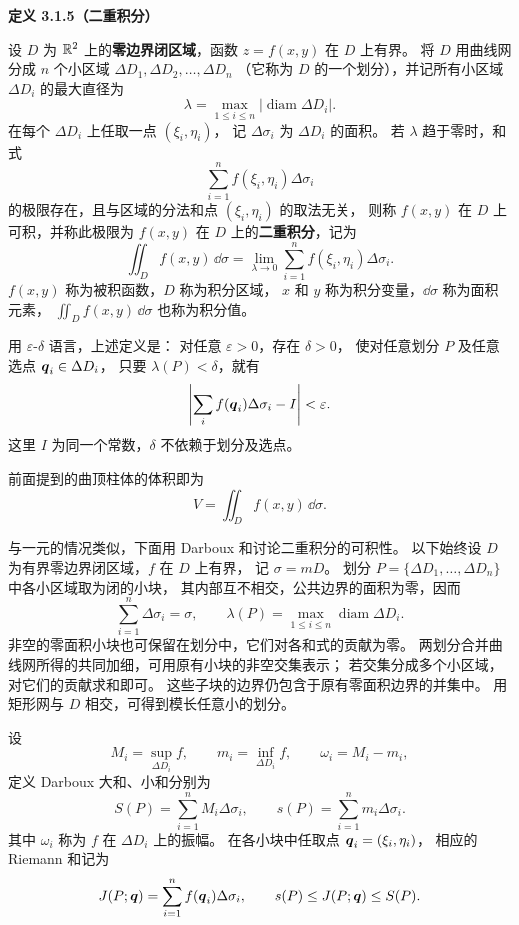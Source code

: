 \textbf{定义 3.1.5（二重积分）}


设 $D$ 为 $\mathbb{R}^2$ 上的\textbf{零边界闭区域}，函数 $z=f(x,y)$ 在 $D$ 上有界。
将 $D$ 用曲线网分成 $n$ 个小区域
$\Delta D_1,\Delta D_2,\ldots,\Delta D_n$
（它称为 $D$ 的一个划分），并记所有小区域
$\Delta D_i$ 的最大直径为
\[
\lambda=\max_{1\le i\le n}|\operatorname{diam}\Delta D_i|.
\]
在每个 $\Delta D_i$ 上任取一点 $(\xi_i,\eta_i)$，
记 $\Delta\sigma_i$ 为 $\Delta D_i$ 的面积。
若 $\lambda$ 趋于零时，和式
\[
\sum_{i=1}^n f(\xi_i,\eta_i)\Delta\sigma_i
\]
的极限存在，且与区域的分法和点
$(\xi_i,\eta_i)$ 的取法无关，
则称 $f(x,y)$ 在 $D$ 上可积，并称此极限为
$f(x,y)$ 在 $D$ 上的\textbf{二重积分}，记为
\[
\iint_D f(x,y)\,\dd\sigma
=\lim_{\lambda\to0}
\sum_{i=1}^n f(\xi_i,\eta_i)\Delta\sigma_i.
\]
$f(x,y)$ 称为被积函数，$D$ 称为积分区域，
$x$ 和 $y$ 称为积分变量，$\dd\sigma$ 称为面积元素，
$\displaystyle\iint_D f(x,y)\,\dd\sigma$ 也称为积分值。




用 $\varepsilon$-$\delta$ 语言，上述定义是：
对任意 $\varepsilon>0$，存在 $\delta>0$，
使对任意划分 $P$ 及任意选点 $ \boldsymbol{q}_i\in\Delta D_i$，
只要 $\lambda(P)<\delta$，就有
\[
\left|\sum_i f(\boldsymbol{q}_i)\Delta\sigma_i-I\right|<\varepsilon.
\]
这里 $I$ 为同一个常数，$\delta$ 不依赖于划分及选点。

前面提到的曲顶柱体的体积即为
\[
V=\iint_D f(x,y)\,\dd\sigma.
\]

与一元的情况类似，下面用 Darboux 和讨论二重积分的可积性。
以下始终设 $D$ 为有界零边界闭区域，$f$ 在 $D$ 上有界，
记 $\sigma=mD$。
划分 $P=\{\Delta D_1,\ldots,\Delta D_n\}$ 中各小区域取为闭的小块，
其内部互不相交，公共边界的面积为零，因而
\[
\sum_{i=1}^n\Delta\sigma_i=\sigma,
\qquad
\lambda(P)=\max_{1\le i\le n}\operatorname{diam}\Delta D_i.
\]
非空的零面积小块也可保留在划分中，它们对各和式的贡献为零。
两划分合并曲线网所得的共同加细，可用原有小块的非空交集表示；
若交集分成多个小区域，对它们的贡献求和即可。
这些子块的边界仍包含于原有零面积边界的并集中。
用矩形网与 $D$ 相交，可得到模长任意小的划分。

设
\[
M_i=\sup_{\Delta D_i}f,\qquad
m_i=\inf_{\Delta D_i}f,\qquad
\omega_i=M_i-m_i,
\]
定义 Darboux 大和、小和分别为
\[
S(P)=\sum_{i=1}^n M_i\Delta\sigma_i,\qquad
s(P)=\sum_{i=1}^n m_i\Delta\sigma_i.
\]
其中 $\omega_i$ 称为 $f$ 在 $\Delta D_i$ 上的振幅。
在各小块中任取点 $\boldsymbol{q}_i=(\xi_i,\eta_i)$，
相应的 Riemann 和记为
\[
J(P;\boldsymbol{q})=\sum_{i=1}^n f(\boldsymbol{q}_i)\Delta\sigma_i,
\qquad
s(P)\le J(P;\boldsymbol{q})\le S(P).
\]

